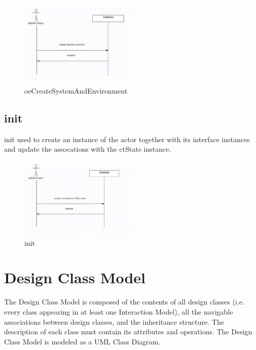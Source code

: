 \begin{figure}[H]
\begin{center}
\includegraphics[width=0.5\textwidth]{./images/oeCreateSystemAndEnvironment.eps} 
\end{center}
\caption{oeCreateSystemAndEnvironment}
\end{figure}

\subsection{init}
init used to create an instance of the actor together with its interface
instances and update the assocations with the ctState instance.

\begin{figure}[H]
\begin{center}
\includegraphics[width=0.5\textwidth]{./images/init.eps} 
\end{center}
\caption{init}
\end{figure}




\section{Design Class Model}
The Design Class Model is composed of the contents of all design classes (i.e.
every class appearing in at least one Interaction Model), all the navigable associations between design
classes, and the inheritance structure. The description of each class must
contain its attributes and operations. The Design Class Model is modeled as a
UML Class Diagram. 

